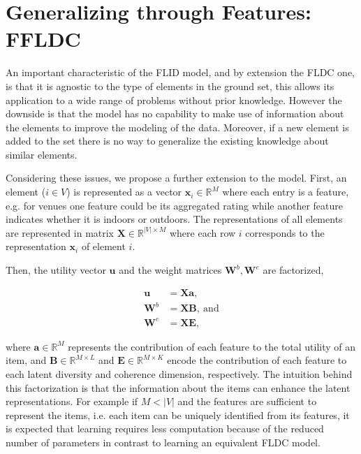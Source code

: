 \section{Generalizing through Features: FFLDC}

An important characteristic of the FLID model, and by extension the FLDC one, is that it is agnostic to the type of elements in the ground set, this allows its application to a wide range of problems without prior knowledge. However the downside is that the model has no capability to make use of information about the elements to improve the modeling of the data. Moreover, if a new element is added to the set there is no way to generalize the existing knowledge about similar elements.

Considering these issues, we propose a further extension to the model. First, an element ($i \in V$) is represented as a vector $\mathbf{x}_{i} \in \mathbb{R}^{M}$ where each entry is a feature, e.g. for venues one feature could be its aggregated rating while another feature indicates whether it is indoors or outdoors. The representations of all elements are represented in matrix $\mathbf{X} \in \mathbb{R}^{|V| \times M}$ where each row $i$ corresponds to the representation $\mathbf{x}_{i}$ of element $i$.

Then, the utility vector $\mathbf{u}$ and the weight matrices $\mathbf{W}^{b}, \mathbf{W}^{e}$ are factorized,

\begin{align}
  \mathbf{u} &= \mathbf{Xa},   \label{eq:ffldc-factorization-1} \\
  \mathbf{W}^{b} &= \mathbf{XB},\ \text{and}  \label{eq:ffldc-factorization-2} \\
  \mathbf{W}^{e} &= \mathbf{XE},
  \label{eq:ffldc-factorization-3}
\end{align} 

where $\mathbf{a} \in \mathbb{R}^{M}$ represents the contribution of each feature to the total utility of an item, and $\mathbf{B} \in \mathbb{R}^{M \times L}$ and $\mathbf{E} \in \mathbb{R}^{M \times K}$ encode the contribution of each feature to each latent diversity and coherence dimension, respectively. The intuition behind this factorization is that the information about the items can enhance the latent representations. For example if $M < |V|$ and the features are sufficient to represent the items, i.e. each item can be uniquely identified from its features, it is expected that learning requires less computation because of the reduced number of parameters in contrast to learning an equivalent FLDC model.

